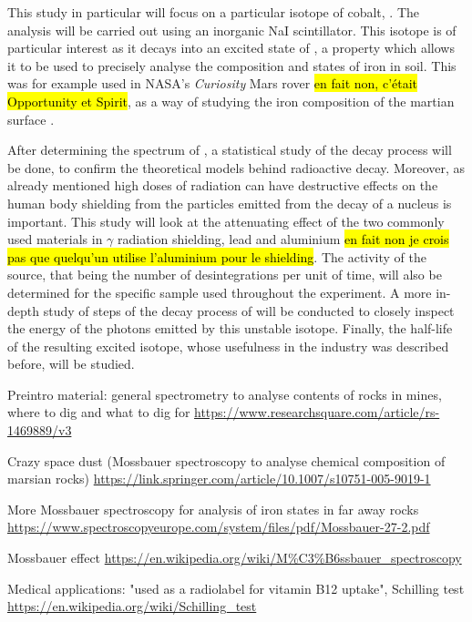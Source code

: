 This study in particular will focus on a particular isotope of cobalt, \cobalt.
The analysis will be carried out using an inorganic NaI scintillator.
This isotope is of particular interest as it decays into an excited state of \iron, a property which allows it to be used to precisely analyse the composition and states of iron in soil.
This was for example used in NASA's \emph{Curiosity} Mars rover \hl{en fait non, c'était Opportunity et Spirit}, as a way of studying the iron composition of the martian surface \cite{klingelhofer_mossbauer_2004} \cite{schroder_mossbauer_2015}.

After determining the spectrum of \cobalt, a statistical study of the decay process will be done, to confirm the theoretical models behind radioactive decay.
Moreover, as already mentioned high doses of radiation can have destructive effects on the human body
shielding from the particles emitted from the decay of a nucleus is important.
This study will look at the attenuating effect of the two commonly used materials in $\gamma$ radiation shielding, lead and aluminium \hl{en fait non je crois pas que quelqu'un utilise l'aluminium  pour le shielding}.
The activity of the source, that being the number of desintegrations per unit of time, will also be determined for the specific \cobalt sample used throughout the experiment.
A more in-depth study of steps of the decay process of \cobalt will be conducted to closely inspect the energy of the photons emitted by this unstable isotope.
Finally, the half-life of the resulting excited \iron isotope, whose usefulness in the industry was described before, will be studied.

Preintro material: general spectrometry to analyse contents of rocks in mines, where to dig and what to dig for \url{https://www.researchsquare.com/article/rs-1469889/v3} \cite{ramadhany_assessment_2022}

Crazy space dust (Mossbauer spectroscopy to analyse chemical composition of marsian rocks) \url{https://link.springer.com/article/10.1007/s10751-005-9019-1}

More Mossbauer spectroscopy for analysis of iron states in far away rocks \url{https://www.spectroscopyeurope.com/system/files/pdf/Mossbauer-27-2.pdf}

Mossbauer effect \url{https://en.wikipedia.org/wiki/M%C3%B6ssbauer_spectroscopy}

Medical applications: "used as a radiolabel for vitamin B12 uptake", Schilling test \url{https://en.wikipedia.org/wiki/Schilling_test}